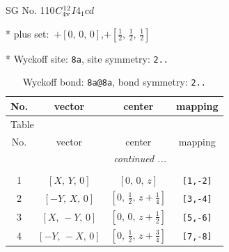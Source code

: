 \documentclass[fleqn,8pt]{jsarticle}
\begin{document}
\setcounter{MaxMatrixCols}{32}

\renewcommand{\tablename}{Table~}
\renewcommand{\figurename}{Figure~}
\begin{center}
\LARGE
SG No. 110\quad$C_{\rm 4v}^{12}$\quad$I4_1cd$\quad[ tetragonal ]
\end{center}

* plus set:\,\,\,$+\left[ 0,\, 0,\, 0 \right]$,\quad $+\left[ \frac{1}{2},\, \frac{1}{2},\, \frac{1}{2} \right]$


* Wyckoff site: {\tt 8a}, site symmetry: {\tt 2..}
\renewcommand{\arraystretch}{1.2}
\begin{longtable}{cccc}
\caption{Wyckoff bond: {\tt 8a@8a}, bond symmetry: {\tt 2..}}
 \\
 \hline \hline
No. & vector & center & mapping \\ \hline \endfirsthead

\multicolumn{3}{l}{\tablename\ \thetable{}} \\
 \hline \hline
No. & vector & center & mapping \\ \hline \endhead

 \hline \hline
\multicolumn{3}{r}{\footnotesize\it continued ...} \\ \endfoot

 \hline \hline
\multicolumn{3}{r}{} \\ \endlastfoot

1 & $\left[ X,\, Y,\, 0 \right]$ & $\left[ 0,\, 0,\, z \right]$ & {\tt [1,-2]} \\ \hline
2 & $\left[ - Y,\, X,\, 0 \right]$ & $\left[ 0,\, \frac{1}{2},\, z + \frac{1}{4} \right]$ & {\tt [3,-4]} \\ \hline
3 & $\left[ X,\, - Y,\, 0 \right]$ & $\left[ 0,\, 0,\, z + \frac{1}{2} \right]$ & {\tt [5,-6]} \\ \hline
4 & $\left[ - Y,\, - X,\, 0 \right]$ & $\left[ 0,\, \frac{1}{2},\, z + \frac{3}{4} \right]$ & {\tt [7,-8]} \\
\end{longtable}
\renewcommand{\arraystretch}{1.2}
\end{document}
